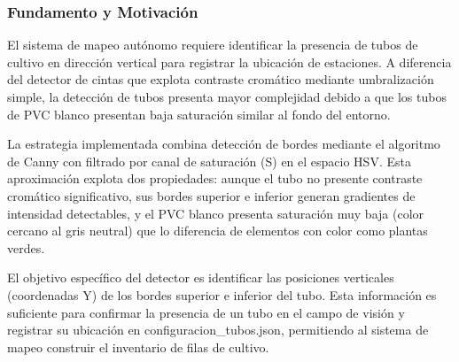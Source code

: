 \subsubsection{Fundamento y Motivación}

El sistema de mapeo autónomo requiere identificar la presencia de tubos de cultivo en dirección vertical para registrar la ubicación de estaciones. A diferencia del detector de cintas que explota contraste cromático mediante umbralización simple, la detección de tubos presenta mayor complejidad debido a que los tubos de PVC blanco presentan baja saturación similar al fondo del entorno.

La estrategia implementada combina detección de bordes mediante el algoritmo de Canny con filtrado por canal de saturación (S) en el espacio HSV. Esta aproximación explota dos propiedades: aunque el tubo no presente contraste cromático significativo, sus bordes superior e inferior generan gradientes de intensidad detectables, y el PVC blanco presenta saturación muy baja (color cercano al gris neutral) que lo diferencia de elementos con color como plantas verdes.

El objetivo específico del detector es identificar las posiciones verticales (coordenadas Y) de los bordes superior e inferior del tubo. Esta información es suficiente para confirmar la presencia de un tubo en el campo de visión y registrar su ubicación en configuracion\_tubos.json, permitiendo al sistema de mapeo construir el inventario de filas de cultivo.

